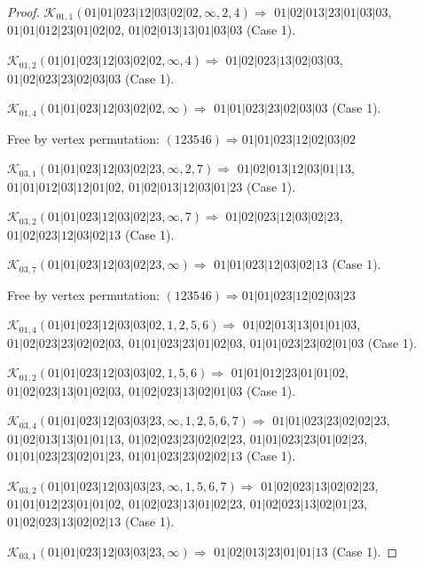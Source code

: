 \documentclass[12pt]{article}
\theoremstyle{plain}
\theoremstyle{definition}
\theoremstyle{remark}
\newcommand{\fancy}[1]{\mathcal{#1}}
\def\K{\fancy{K}}
\begin{document}
\begin{proof}
	
	
	\bigskip
	
	$\K_{01,1}(01|01|023|12|03|02|02,\infty,2, 4)\Rightarrow $ $01|02|013|23|01|03|03$, $01|01|012|23|01|02|02$, $01|02|013|13|01|03|03$ (Case 1).
	
	$\K_{01,2}(01|01|023|12|03|02|02,\infty,4)\Rightarrow $ $01|02|023|13|02|03|03$, $01|02|023|23|02|03|03$ (Case 1).
	
	$\K_{01,4}(01|01|023|12|03|02|02,\infty)\Rightarrow $ $01|01|023|23|02|03|03$ (Case 1).
	
	
	
	Free by vertex permutation: $(1 2 3 5 4 6)\Rightarrow 01|01|023|12|02|03|02$
	
	
	
	\bigskip
	
	$\K_{03,1}(01|01|023|12|03|02|23,\infty,2, 7)\Rightarrow $ $01|02|013|12|03|01|13$, $01|01|012|03|12|01|02$, $01|02|013|12|03|01|23$ (Case 1).
	
	$\K_{03,2}(01|01|023|12|03|02|23,\infty,7)\Rightarrow $ $01|02|023|12|03|02|23$, $01|02|023|12|03|02|13$ (Case 1).
	
	$\K_{03,7}(01|01|023|12|03|02|23,\infty)\Rightarrow $ $01|01|023|12|03|02|13$ (Case 1).
	
	
	
	Free by vertex permutation: $(1 2 3 5 4 6)\Rightarrow 01|01|023|12|02|03|23$
	
	
	
	\bigskip
	
	$\K_{01,4}(01|01|023|12|03|03|02,1, 2, 5, 6)\Rightarrow $ $01|02|013|13|01|01|03$, $01|02|023|23|02|02|03$, $01|01|023|23|01|02|03$, $01|01|023|23|02|01|03$ (Case 1).
	
	$\K_{01,2}(01|01|023|12|03|03|02,1, 5, 6)\Rightarrow $ $01|01|012|23|01|01|02$, $01|02|023|13|01|02|03$, $01|02|023|13|02|01|03$ (Case 1).
	
	
	\bigskip
	
	$\K_{03,4}(01|01|023|12|03|03|23,\infty,1, 2, 5, 6, 7)\Rightarrow $ $01|01|023|23|02|02|23$, $01|02|013|13|01|01|13$, $01|02|023|23|02|02|23$, $01|01|023|23|01|02|23$, $01|01|023|23|02|01|23$, $01|01|023|23|02|02|13$ (Case 1).
	
	$\K_{03,2}(01|01|023|12|03|03|23,\infty,1, 5, 6, 7)\Rightarrow $ $01|02|023|13|02|02|23$, $01|01|012|23|01|01|02$, $01|02|023|13|01|02|23$, $01|02|023|13|02|01|23$, $01|02|023|13|02|02|13$ (Case 1).
	
	$\K_{03,1}(01|01|023|12|03|03|23,\infty)\Rightarrow $ $01|02|013|23|01|01|13$ (Case 1).
	

\end{proof}
\end{document}
